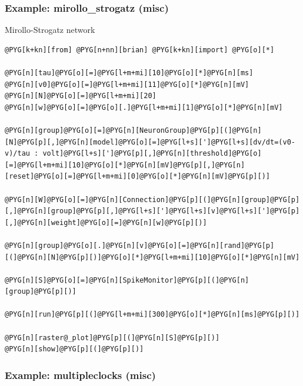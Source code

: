 \documentclass[letterpaper,10pt,english]{manual}
\begin{document}
\resetcurrentobjects
\hypertarget{--doc-examples-misc_mirollo_strogatz}{}

\hypertarget{index-52}{}\subsubsection{Example: mirollo\_strogatz (misc)}

Mirollo-Strogatz network

\begin{Verbatim}[commandchars=@\[\]]
@PYG[k+kn][from] @PYG[n+nn][brian] @PYG[k+kn][import] @PYG[o][*]

@PYG[n][tau]@PYG[o][=]@PYG[l+m+mi][10]@PYG[o][*]@PYG[n][ms]
@PYG[n][v0]@PYG[o][=]@PYG[l+m+mi][11]@PYG[o][*]@PYG[n][mV]
@PYG[n][N]@PYG[o][=]@PYG[l+m+mi][20]
@PYG[n][w]@PYG[o][=]@PYG[o][.]@PYG[l+m+mi][1]@PYG[o][*]@PYG[n][mV]

@PYG[n][group]@PYG[o][=]@PYG[n][NeuronGroup]@PYG[p][(]@PYG[n][N]@PYG[p][,]@PYG[n][model]@PYG[o][=]@PYG[l+s][']@PYG[l+s][dv/dt=(v0-v)/tau : volt]@PYG[l+s][']@PYG[p][,]@PYG[n][threshold]@PYG[o][=]@PYG[l+m+mi][10]@PYG[o][*]@PYG[n][mV]@PYG[p][,]@PYG[n][reset]@PYG[o][=]@PYG[l+m+mi][0]@PYG[o][*]@PYG[n][mV]@PYG[p][)]

@PYG[n][W]@PYG[o][=]@PYG[n][Connection]@PYG[p][(]@PYG[n][group]@PYG[p][,]@PYG[n][group]@PYG[p][,]@PYG[l+s][']@PYG[l+s][v]@PYG[l+s][']@PYG[p][,]@PYG[n][weight]@PYG[o][=]@PYG[n][w]@PYG[p][)]

@PYG[n][group]@PYG[o][.]@PYG[n][v]@PYG[o][=]@PYG[n][rand]@PYG[p][(]@PYG[n][N]@PYG[p][)]@PYG[o][*]@PYG[l+m+mi][10]@PYG[o][*]@PYG[n][mV]

@PYG[n][S]@PYG[o][=]@PYG[n][SpikeMonitor]@PYG[p][(]@PYG[n][group]@PYG[p][)]

@PYG[n][run]@PYG[p][(]@PYG[l+m+mi][300]@PYG[o][*]@PYG[n][ms]@PYG[p][)]

@PYG[n][raster@_plot]@PYG[p][(]@PYG[n][S]@PYG[p][)]
@PYG[n][show]@PYG[p][(]@PYG[p][)]
\end{Verbatim}

\resetcurrentobjects
\hypertarget{--doc-examples-misc_multipleclocks}{}

\hypertarget{index-53}{}\subsubsection{Example: multipleclocks (misc)}
\end{document}
